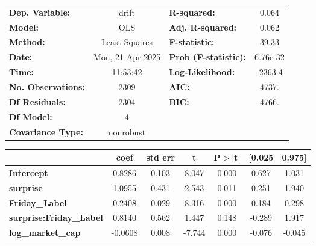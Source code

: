 \begin{center}
\begin{tabular}{lclc}
\toprule
\textbf{Dep. Variable:}         &      drift       & \textbf{  R-squared:         } &     0.064   \\
\textbf{Model:}                 &       OLS        & \textbf{  Adj. R-squared:    } &     0.062   \\
\textbf{Method:}                &  Least Squares   & \textbf{  F-statistic:       } &     39.33   \\
\textbf{Date:}                  & Mon, 21 Apr 2025 & \textbf{  Prob (F-statistic):} &  6.76e-32   \\
\textbf{Time:}                  &     11:53:42     & \textbf{  Log-Likelihood:    } &   -2363.4   \\
\textbf{No. Observations:}      &        2309      & \textbf{  AIC:               } &     4737.   \\
\textbf{Df Residuals:}          &        2304      & \textbf{  BIC:               } &     4766.   \\
\textbf{Df Model:}              &           4      & \textbf{                     } &             \\
\textbf{Covariance Type:}       &    nonrobust     & \textbf{                     } &             \\
\bottomrule
\end{tabular}
\begin{tabular}{lcccccc}
                                & \textbf{coef} & \textbf{std err} & \textbf{t} & \textbf{P$> |$t$|$} & \textbf{[0.025} & \textbf{0.975]}  \\
\midrule
\textbf{Intercept}              &       0.8286  &        0.103     &     8.047  &         0.000        &        0.627    &        1.031     \\
\textbf{surprise}               &       1.0955  &        0.431     &     2.543  &         0.011        &        0.251    &        1.940     \\
\textbf{Friday\_Label}          &       0.2408  &        0.029     &     8.316  &         0.000        &        0.184    &        0.298     \\
\textbf{surprise:Friday\_Label} &       0.8140  &        0.562     &     1.447  &         0.148        &       -0.289    &        1.917     \\
\textbf{log\_market\_cap}       &      -0.0608  &        0.008     &    -7.744  &         0.000        &       -0.076    &       -0.045     \\

\end{tabular}
\end{center}
